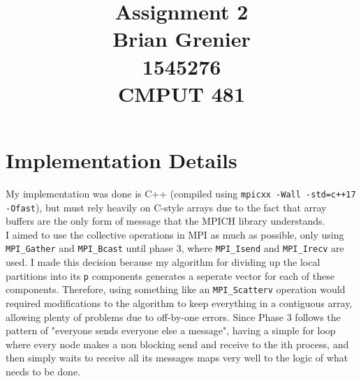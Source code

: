 \documentclass[11pt]{report}
\title{Assignment 2
\\Brian Grenier
\\1545276
\\CMPUT 481}
\begin{document}
\maketitle


\section*{Implementation Details}
My implementation was done is C++ (compiled using \verb|mpicxx -Wall -std=c++17 -Ofast|), but must rely heavily on C-style arrays due to
the fact that array buffers are the only form of message that the MPICH library 
understands.\\
I aimed to use the collective operations in MPI as much as possible, only using \verb|MPI_Gather| and \verb|MPI_Bcast| until phase 3, where \verb|MPI_Isend| and \verb|MPI_Irecv| are used. I made this decision because my algorithm for dividing
up the local partitions into its \verb|p| components generates a seperate vector
for each of these components. Therefore, using something like an \verb|MPI_Scatterv| operation would required modifications to the algorithm to keep everything in a contiguous array, allowing plenty of problems due to off-by-one errors. Since Phase 3 follows the pattern of "everyone sends everyone else a message", having a simple for loop where every node makes a non blocking send and receive to the ith process, and then simply waits to receive all its messages maps very well to the logic of what needs to be done.
\end{document}
